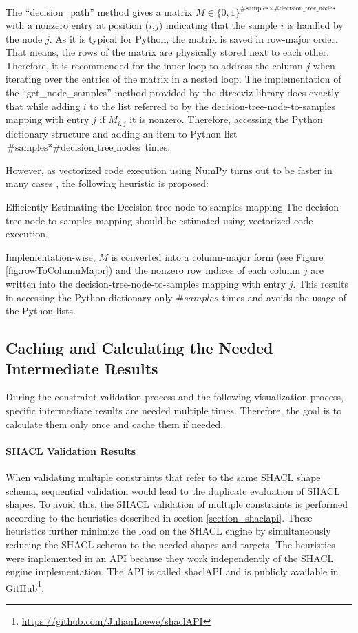 The ``decision\_path'' method gives a matrix $M \in \{0,1\}^{\textrm{\#samples} \times \textrm{\#decision\_tree\_nodes}}$ with a nonzero entry at position ($i$,$j$) indicating that the sample $i$ is handled by the node $j$. As it is typical for Python, the matrix is saved in row-major order. That means, the rows of the matrix are physically stored next to each other. Therefore, it is recommended for the inner loop to address the column $j$ when iterating over the entries of the matrix in a nested loop. The implementation of the ``get\_node\_samples'' method provided by the dtreeviz library does exactly that while adding $i$ to the list referred to by the decision-tree-node-to-samples mapping with entry $j$ if $M_{i,j}$ it is nonzero. Therefore, accessing the Python dictionary structure and adding an item to Python list $\textrm{\#samples} * \textrm{\#decision\_tree\_nodes}$ times. 

However, as vectorized code execution using NumPy turns out to be faster in many cases \cite{numpy}, the following heuristic is proposed:

\begin{Satz}{Efficiently Estimating the Decision-tree-node-to-samples mapping}{}
    The decision-tree-node-to-samples mapping should be estimated using vectorized code execution.
\end{Satz}

Implementation-wise, $M$ is converted into a column-major form (see Figure \ref{fig:rowToColumnMajor}) and the nonzero row indices of each column $j$ are written into the decision-tree-node-to-samples mapping with entry $j$. This results in accessing the Python dictionary only $\#samples$ times and avoids the usage of the Python lists.

\subsection{Caching and Calculating the Needed Intermediate Results}
During the constraint validation process and the following visualization process, specific intermediate results are needed multiple times. Therefore, the goal is to calculate them only once and cache them if needed.

\paragraph{SHACL Validation Results} When validating multiple constraints that refer to the same SHACL shape schema, sequential validation would lead to the duplicate evaluation of SHACL shapes. To avoid this, the SHACL validation of multiple constraints is performed according to the heuristics described in section \ref{section_shaclapi}. These heuristics further minimize the load on the SHACL engine by simultaneously reducing the SHACL schema to the needed shapes and targets. The heuristics were implemented in an API because they work independently of the SHACL engine implementation. The API is called shaclAPI and is publicly available in GitHub\footnote{\href{https://github.com/JulianLoewe/shaclAPI}{https://github.com/JulianLoewe/shaclAPI}}. 

